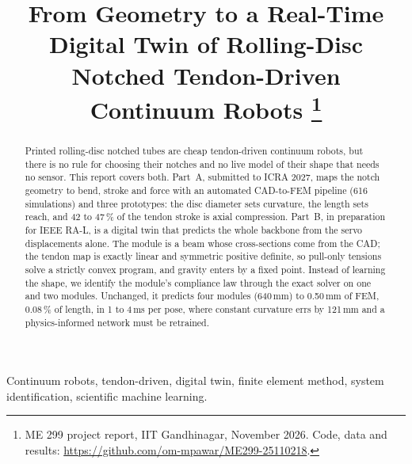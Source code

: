 \documentclass[conference]{IEEEtran}
\begin{document}
\title{From Geometry to a Real-Time Digital Twin of Rolling-Disc Notched Tendon-Driven Continuum Robots%
\thanks{ME 299 project report, IIT Gandhinagar, November 2026. Code, data and results:
\protect\url{https://github.com/om-mpawar/ME299-25110218}.}}

\author{
\and
{}
}

\maketitle

\begin{abstract}
Printed rolling-disc notched tubes are cheap tendon-driven continuum robots, but there is no rule for choosing their
notches and no live model of their shape that needs no sensor. This report covers both. Part~A, submitted to ICRA 2027,
maps the notch geometry to bend, stroke and force with an automated CAD-to-FEM pipeline (616 simulations) and three
prototypes: the disc diameter sets curvature, the length sets reach, and 42 to 47\,\% of the tendon stroke is axial
compression. Part~B, in preparation for IEEE RA-L, is a digital twin that predicts the whole backbone from the servo
displacements alone. The module is a beam whose cross-sections come from the CAD; the tendon map is exactly linear and
symmetric positive definite, so pull-only tensions solve a strictly convex program, and gravity enters by a fixed
point. Instead of learning the shape, we identify the module's compliance law through the exact solver on one and two
modules. Unchanged, it predicts four modules (640\,mm) to 0.50\,mm of FEM, 0.08\,\% of length, in 1 to 4\,ms per pose,
where constant curvature errs by 121\,mm and a physics-informed network must be retrained.
\end{abstract}

\begin{IEEEkeywords}
Continuum robots, tendon-driven, digital twin, finite element method, system identification, scientific machine learning.
\end{IEEEkeywords}

\end{document}
